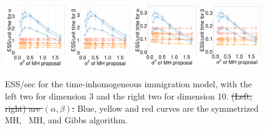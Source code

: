   \begin{figure}[H]
  \centering
  \begin{minipage}[!hp]{0.99\linewidth}
  \centering
    \includegraphics [width=0.24\textwidth, angle=0]{figs/new_whole_exp_figs/cq_alpha_dim3.pdf}
    \includegraphics [width=0.24\textwidth, angle=0]{figs/new_whole_exp_figs/cq_beta_dim3.pdf}
    \includegraphics [width=0.24\textwidth, angle=0]{figs/new_whole_exp_figs/cq_alpha_dim10.pdf}
    \includegraphics [width=0.24\textwidth, angle=0]{figs/new_whole_exp_figs/cq_beta_dim10.pdf}
  \end{minipage}
    \caption{ESS/sec for the time-inhomogeneous immigration model, with the left two for 
      dimension 3 and the right two for dimension 10. \sout{(Left, right) are $(\alpha, \beta)$.}  Blue, yellow and red curves are the symmetrized MH,
  \naive\ MH, and Gibbs algorithm.}
     \label{fig:ESS_pc_33}
\end{figure}

